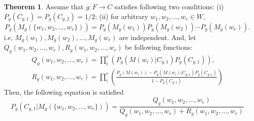 \documentclass[11pt, a4note]{article}
\theoremstyle{definition}
\newtheorem{theorem}{Theorem}[section]
\begin{document}
\begin{theorem}
Assume that $ g : F \to C $ satisfies following two conditions:
(i) $ P_{g}(C_{g,1}) = P_{g}(C_{g,2}) = 1/2 $;
(ii) for arbitrary $ w_{1}, w_{2}, \dots, w_{r} \in W $,
\begin{equation}
P_{g}(M_{g}(\{ w_{1}, w_{2}, \dots, w_{r} \})) = P_{g}(M_{g}(w_{1}))P_{g}(M_{g}(w_{2})) \cdots P_{g}(M_{g}(w_{r})).
\end{equation}
i.e, $ M_{g}(w_{1}), M_{g}(w_{2}), \dots, M_{g}(w_{r}) $ are independent.
And, let $ Q_{g}(w_{1}, w_{2}, \dots, w_{r}), R_{g}(w_{1}, w_{2}, \dots, w_{r}) $ be following functions:
\begin{eqnarray}
Q_{g}(w_{1}, w_{2}, \dots, w_{r}) = \prod_{i}^{r}(P_{g}(M(w_{i})|C_{g,1})P_{g}(C_{g,1})), \\
R_{g}(w_{1}, w_{2}, \dots, w_{r}) = \prod_{i}^{r}(\frac{P_{g}(M(w_{i})) - P_{g}(M(w_{i})|C_{g,1})P_{g}(C_{g,1})}{1 - P_{g}(C_{g,1})})
\end{eqnarray}
Then, the following equation is satisfied
\begin{equation}
P_{g}(C_{g,1}|M_{g}(\{ w_{1}, w_{2}, \dots, w_{r} \}))
= \frac{Q_{g}(w_{1}, w_{2}, \dots, w_{r})}{Q_{g}(w_{1}, w_{2}, \dots, w_{r}) + R_{g}(w_{1}, w_{2}, \dots, w_{r})} 
\end{equation}
\end{theorem}

\end{document}
